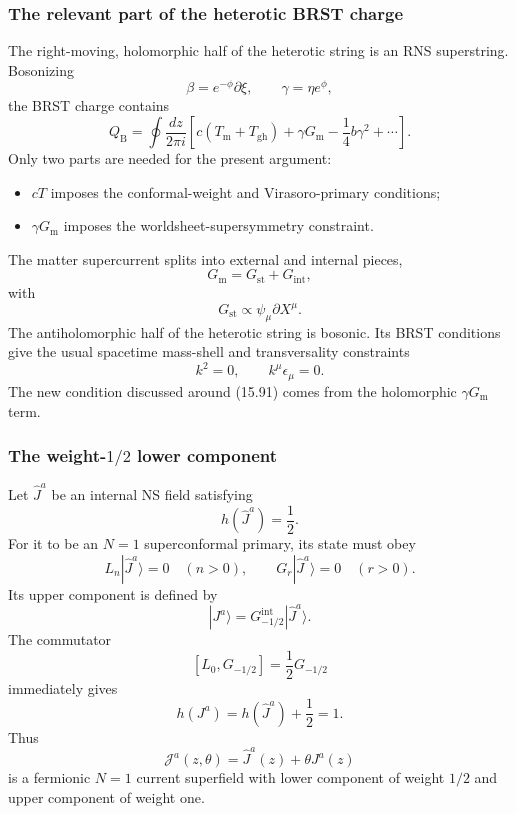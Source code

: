 \documentclass[
  10pt,
  a4paper,
  openany]{book}
\providecommand{\tightlist}{%
  \setlength{\itemsep}{0pt}\setlength{\parskip}{0pt}}
\begin{document}
\subsubsection{The relevant part of the heterotic BRST
charge}\label{the-relevant-part-of-the-heterotic-brst-charge}

The right-moving, holomorphic half of the heterotic string is an RNS
superstring. Bosonizing \[
\beta=e^{-\phi}\partial\xi,
\qquad
\gamma=\eta e^\phi,
\] the BRST charge contains \[
Q_{\mathrm B}
=
\oint\frac{dz}{2\pi i}
\left[
c\left(T_{\mathrm m}+T_{\mathrm{gh}}\right)
+\gamma G_{\mathrm m}
-\frac14b\gamma^2
+\cdots
\right].
\] Only two parts are needed for the present argument:

\begin{itemize}
\tightlist
\item
  \(cT\) imposes the conformal-weight and Virasoro-primary conditions;
\item
  \(\gamma G_{\mathrm m}\) imposes the worldsheet-supersymmetry
  constraint.
\end{itemize}

The matter supercurrent splits into external and internal pieces, \[
G_{\mathrm m}
=
G_{\mathrm{st}}+G_{\mathrm{int}},
\] with \[
G_{\mathrm{st}}
\propto
\psi_\mu\partial X^\mu.
\] The antiholomorphic half of the heterotic string is bosonic. Its BRST
conditions give the usual spacetime mass-shell and transversality
constraints \[
k^2=0,
\qquad
k^\mu\epsilon_\mu=0.
\] The new condition discussed around (15.91) comes from the holomorphic
\(\gamma G_{\mathrm m}\) term.

\subsubsection{\texorpdfstring{The weight-\(1/2\) lower
component}{The weight-1/2 lower component}}\label{the-weight-12-lower-component}

Let \(\hat J^a\) be an internal NS field satisfying \[
h(\hat J^a)=\frac12.
\] For it to be an \(N=1\) superconformal primary, its state must obey
\[
L_n|\hat J^a\rangle=0
\quad(n>0),
\qquad
G_r|\hat J^a\rangle=0
\quad(r>0).
\] Its upper component is defined by \[
\boxed{
|J^a\rangle
=
G_{-1/2}^{\mathrm{int}}|\hat J^a\rangle.
}
\] The commutator \[
[L_0,G_{-1/2}]
=
\frac12G_{-1/2}
\] immediately gives \[
h(J^a)
=
h(\hat J^a)+\frac12
=1.
\] Thus \[
\mathscr J^a(z,\theta)
=
\hat J^a(z)+\theta J^a(z)
\] is a fermionic \(N=1\) current superfield with lower component of
weight \(1/2\) and upper component of weight one.
\end{document}
